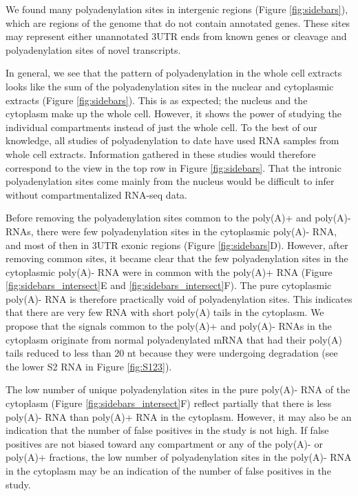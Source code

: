 We found many polyadenylation sites in intergenic regions (Figure
\ref{fig:sidebars}), which are regions of the genome that do not contain
annotated genes. These sites may represent either unannotated 3\ppp UTR
ends from known genes or cleavage and polyadenylation sites of novel
transcripts.

In general, we see that the pattern of polyadenylation in the whole cell
extracts looks like the sum of the polyadenylation sites in the nuclear and
cytoplasmic extracts (Figure \ref{fig:sidebars}). This is as expected; the
nucleus and the cytoplasm make up the whole cell. However, it shows the power
of studying the individual compartments instead of just the whole cell. To the
best of our knowledge, all studies of polyadenylation to date have used RNA
samples from whole cell extracts. Information gathered in these studies would
therefore correspond to the view in the top row in Figure \ref{fig:sidebars}.
That the intronic polyadenylation sites come mainly from the nucleus would be
difficult to infer without compartmentalized RNA-seq data.

Before removing the polyadenylation sites common to the poly(A)+ and poly(A)-
RNAs, there were few polyadenylation sites in the cytoplasmic poly(A)- RNA, and
most of then in 3\ppp UTR exonic regions (Figure \ref{fig:sidebars}D).
However, after removing common sites, it became clear that the few
polyadenylation sites in the cytoplasmic poly(A)- RNA were in common with the
poly(A)+ RNA (Figure \ref{fig:sidebars_intersect}E and
\ref{fig:sidebars_intersect}F). The pure cytoplasmic poly(A)- RNA is therefore
practically void of polyadenylation sites. This indicates that there are very
few RNA with short poly(A) tails in the cytoplasm. We propose that the signals
common to the poly(A)+ and poly(A)- RNAs in the cytoplasm originate from normal
polyadenylated mRNA that had their poly(A) tails reduced to less than 20 nt
because they were undergoing degradation (see the lower S2 RNA in Figure
\ref{fig:S123}).

The low number of unique polyadenylation sites in the pure poly(A)- RNA of the
cytoplasm (Figure \ref{fig:sidebars_intersect}F) reflect partially that there
is less poly(A)- RNA than poly(A)+ RNA in the cytoplasm. However, it may also
be an indication that the number of false positives in the study is not high.
If false positives are not biased toward any compartment or any of the
poly(A)- or poly(A)+ fractions, the low number of polyadenylation sites in the
poly(A)- RNA in the cytoplasm may be an indication of the number of false
positives in the study. 

